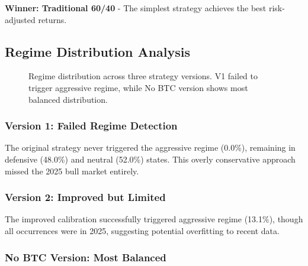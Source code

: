 \documentclass[twocolumn,ieee]{arithmaxresearch}
\begin{document}
\textbf{Winner: Traditional 60/40} - The simplest strategy achieves the best risk-adjusted returns.

\subsection{Regime Distribution Analysis}

\begin{figure}[h]
\centering
{}
\caption{Regime distribution across three strategy versions. V1 failed to trigger aggressive regime, while No BTC version shows most balanced distribution.}
\label{fig:regime_dist}
\end{figure}

\subsubsection{Version 1: Failed Regime Detection}

The original strategy never triggered the aggressive regime (0.0\%), remaining in defensive (48.0\%) and neutral (52.0\%) states. This overly conservative approach missed the 2025 bull market entirely.

\subsubsection{Version 2: Improved but Limited}

The improved calibration successfully triggered aggressive regime (13.1\%), though all occurrences were in 2025, suggesting potential overfitting to recent data.

\subsubsection{No BTC Version: Most Balanced}
\end{document}

